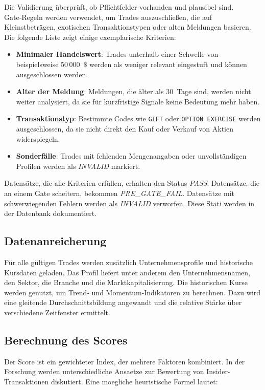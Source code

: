 Die Validierung überprüft, ob Pflichtfelder vorhanden und plausibel sind. Gate‑Regeln werden verwendet, um Trades auszuschließen, die auf Kleinstbeträgen, exotischen Transaktionstypen oder alten Meldungen basieren. Die folgende Liste zeigt einige exemplarische Kriterien:

\begin{itemize}[leftmargin=1.2cm]
  \item \textbf{Minimaler Handelswert}: Trades unterhalb einer Schwelle von beispielsweise 50\,000~\$ werden als weniger relevant eingestuft und können ausgeschlossen werden.
  \item \textbf{Alter der Meldung}: Meldungen, die älter als 30 Tage sind, werden nicht weiter analysiert, da sie für kurzfristige Signale keine Bedeutung mehr haben.
  \item \textbf{Transaktionstyp}: Bestimmte Codes wie \texttt{GIFT} oder \texttt{OPTION EXERCISE} werden ausgeschlossen, da sie nicht direkt den Kauf oder Verkauf von Aktien widerspiegeln.
  \item \textbf{Sonderfälle}: Trades mit fehlenden Mengenangaben oder unvollständigen Profilen werden als \emph{INVALID} markiert.
\end{itemize}

Datensätze, die alle Kriterien erfüllen, erhalten den Status \emph{PASS}. Datensätze, die an einem Gate scheitern, bekommen \emph{PRE\_GATE\_FAIL}. Datensätze mit schwerwiegenden Fehlern werden als \emph{INVALID} verworfen. Diese Stati werden in der Datenbank dokumentiert.

\subsection{Datenanreicherung}

Für alle gültigen Trades werden zusätzlich Unternehmensprofile und historische Kursdaten geladen. Das Profil liefert unter anderem den Unternehmensnamen, den Sektor, die Branche und die Marktkapitalisierung. Die historischen Kurse werden genutzt, um Trend‑ und Momentum‑Indikatoren zu berechnen. Dazu wird eine gleitende Durchschnittsbildung angewandt und die relative Stärke über verschiedene Zeitfenster ermittelt.

\subsection{Berechnung des Scores}

Der Score ist ein gewichteter Index, der mehrere Faktoren kombiniert. In der Forschung werden unterschiedliche Ansaetze zur Bewertung von Insider-Transaktionen diskutiert. Eine moegliche heuristische Formel lautet:

